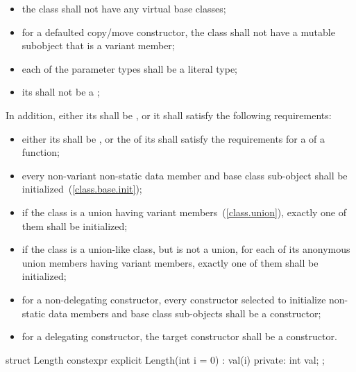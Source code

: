 \begin{itemize}
\item
the class shall not have any virtual base classes;

\item
for a defaulted copy/move constructor, the class shall not have a
mutable subobject that is a variant member;

\item
each of the parameter types shall be a literal type;

\item
its  shall not be a ;
\end{itemize}

In addition, either its  shall be
, or it shall satisfy the following requirements:

\begin{itemize}
\item
either its  shall be , or the  of its 
shall satisfy the requirements for a  of a
 function;

\item
every non-variant non-static data member and base class sub-object
shall be initialized~(\ref{class.base.init});

\item
if the class is a union having variant members~(\ref{class.union}), exactly one of them
shall be initialized;

\item
if the class is a union-like class, but is not a union, for each of its anonymous union
members having variant members, exactly one of them shall be initialized;

\item
for a non-delegating constructor, every constructor selected to initialize non-static
data members and base class sub-objects shall be a  constructor;

\item
for a delegating constructor, the target constructor shall be a 
constructor.
\end{itemize}

\enterexample
\begin{codeblock}
struct Length { 
  constexpr explicit Length(int i = 0) : val(i) { }
private: 
  int val; 
}; 
\end{codeblock}
\exitexample

